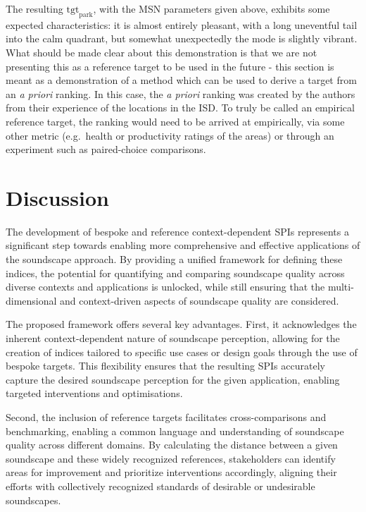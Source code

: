 \documentclass[
  authoryear,
  preprint,
  3p]{elsarticle}
\begin{document}
The resulting \(\text{tgt}_{\text{park}}\), with the MSN parameters
given above, exhibits some expected characteristics: it is almost
entirely pleasant, with a long uneventful tail into the calm quadrant,
but somewhat unexpectedly the mode is slightly vibrant. What should be
made clear about this demonstration is that we are not presenting this
as a reference target to be used in the future - this section is meant
as a demonstration of a method which can be used to derive a target from
an \emph{a priori} ranking. In this case, the \emph{a priori} ranking
was created by the authors from their experience of the locations in the
ISD. To truly be called an empirical reference target, the ranking would
need to be arrived at empirically, via some other metric (e.g.~health or
productivity ratings of the areas) or through an experiment such as
paired-choice comparisons.

\section{Discussion}\label{discussion}

The development of bespoke and reference context-dependent SPIs
represents a significant step towards enabling more comprehensive and
effective applications of the soundscape approach. By providing a
unified framework for defining these indices, the potential for
quantifying and comparing soundscape quality across diverse contexts and
applications is unlocked, while still ensuring that the
multi-dimensional and context-driven aspects of soundscape quality are
considered.

The proposed framework offers several key advantages. First, it
acknowledges the inherent context-dependent nature of soundscape
perception, allowing for the creation of indices tailored to specific
use cases or design goals through the use of bespoke targets. This
flexibility ensures that the resulting SPIs accurately capture the
desired soundscape perception for the given application, enabling
targeted interventions and optimisations.

Second, the inclusion of reference targets facilitates cross-comparisons
and benchmarking, enabling a common language and understanding of
soundscape quality across different domains. By calculating the distance
between a given soundscape and these widely recognized references,
stakeholders can identify areas for improvement and prioritize
interventions accordingly, aligning their efforts with collectively
recognized standards of desirable or undesirable soundscapes.
\end{document}
